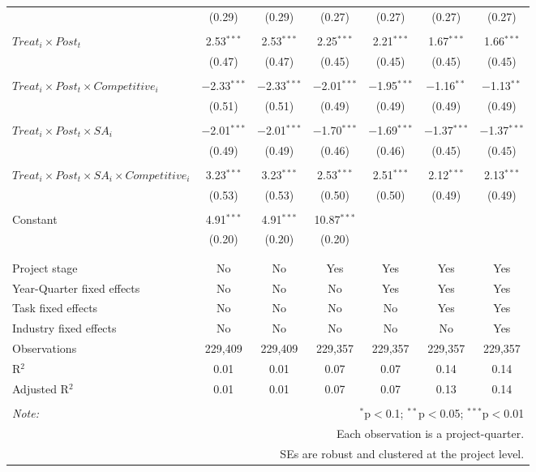 \documentclass[
]{article}
\begin{document}
\begin{table}[H]
\begin{tabular}{@{\extracolsep{-3pt}}lcccccc}
  & (0.29) & (0.29) & (0.27) & (0.27) & (0.27) & (0.27) \\ 
  & & & & & & \\ 
 $Treat_i \times Post_t$ & 2.53$^{***}$ & 2.53$^{***}$ & 2.25$^{***}$ & 2.21$^{***}$ & 1.67$^{***}$ & 1.66$^{***}$ \\ 
  & (0.47) & (0.47) & (0.45) & (0.45) & (0.45) & (0.45) \\ 
  & & & & & & \\ 
 $Treat_i \times Post_t \times Competitive_i$ & $-$2.33$^{***}$ & $-$2.33$^{***}$ & $-$2.01$^{***}$ & $-$1.95$^{***}$ & $-$1.16$^{**}$ & $-$1.13$^{**}$ \\ 
  & (0.51) & (0.51) & (0.49) & (0.49) & (0.49) & (0.49) \\ 
  & & & & & & \\ 
 $Treat_i \times Post_t \times SA_i$ & $-$2.01$^{***}$ & $-$2.01$^{***}$ & $-$1.70$^{***}$ & $-$1.69$^{***}$ & $-$1.37$^{***}$ & $-$1.37$^{***}$ \\ 
  & (0.49) & (0.49) & (0.46) & (0.46) & (0.45) & (0.45) \\ 
  & & & & & & \\ 
 $Treat_i \times Post_t \times SA_i \times Competitive_i$ & 3.23$^{***}$ & 3.23$^{***}$ & 2.53$^{***}$ & 2.51$^{***}$ & 2.12$^{***}$ & 2.13$^{***}$ \\ 
  & (0.53) & (0.53) & (0.50) & (0.50) & (0.49) & (0.49) \\ 
  & & & & & & \\ 
 Constant & 4.91$^{***}$ & 4.91$^{***}$ & 10.87$^{***}$ &  &  &  \\ 
  & (0.20) & (0.20) & (0.20) &  &  &  \\ 
  & & & & & & \\ 
\hline \\[-1.8ex] 
Project stage & No & No & Yes & Yes & Yes & Yes \\ 
Year-Quarter fixed effects & No & No & No & Yes & Yes & Yes \\ 
Task fixed effects & No & No & No & No & Yes & Yes \\ 
Industry fixed effects & No & No & No & No & No & Yes \\ 
Observations & 229,409 & 229,409 & 229,357 & 229,357 & 229,357 & 229,357 \\ 
R$^{2}$ & 0.01 & 0.01 & 0.07 & 0.07 & 0.14 & 0.14 \\ 
Adjusted R$^{2}$ & 0.01 & 0.01 & 0.07 & 0.07 & 0.13 & 0.14 \\ 
\hline 
\hline \\[-1.8ex] 
\textit{Note:}  & \multicolumn{6}{r}{$^{*}$p$<$0.1; $^{**}$p$<$0.05; $^{***}$p$<$0.01} \\ 
 & \multicolumn{6}{r}{Each observation is a project-quarter.} \\ 
 & \multicolumn{6}{r}{SEs are robust and clustered at the project level.} \\ 
\end{tabular} 
\end{table}
\end{document}
